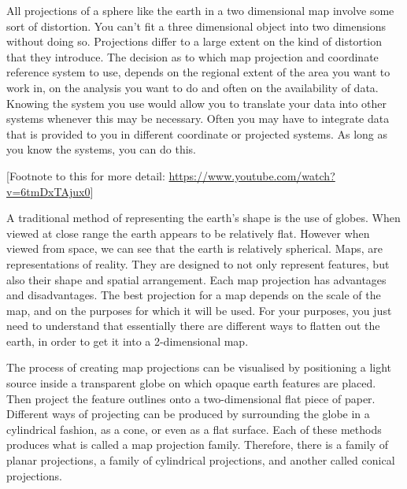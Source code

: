 \documentclass[
]{book}
\begin{document}
All projections of a sphere like the earth in a two dimensional map involve some sort of distortion. You can't fit a three dimensional object into two dimensions without doing so. Projections differ to a large extent on the kind of distortion that they introduce. The decision as to which map projection and coordinate reference system to use, depends on the regional extent of the area you want to work in, on the analysis you want to do and often on the availability of data. Knowing the system you use would allow you to translate your data into other systems whenever this may be necessary. Often you may have to integrate data that is provided to you in different coordinate or projected systems. As long as you know the systems, you can do this.

{[}Footnote to this for more detail: \url{https://www.youtube.com/watch?v=6tmDxTAjux0}{]}

A traditional method of representing the earth's shape is the use of globes. When viewed at close range the earth appears to be relatively flat. However when viewed from space, we can see that the earth is relatively spherical. Maps, are representations of reality. They are designed to not only represent features, but also their shape and spatial arrangement. Each map projection has advantages and disadvantages. The best projection for a map depends on the scale of the map, and on the purposes for which it will be used. For your purposes, you just need to understand that essentially there are different ways to flatten out the earth, in order to get it into a 2-dimensional map.

The process of creating map projections can be visualised by positioning a light source inside a transparent globe on which opaque earth features are placed. Then project the feature outlines onto a two-dimensional flat piece of paper. Different ways of projecting can be produced by surrounding the globe in a cylindrical fashion, as a cone, or even as a flat surface. Each of these methods produces what is called a map projection family. Therefore, there is a family of planar projections, a family of cylindrical projections, and another called conical projections.
\end{document}
